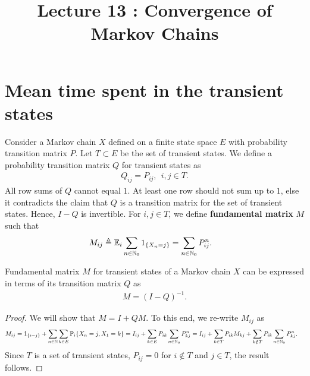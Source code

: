 \documentclass[a4paper,10pt,english]{article}
\title{Lecture 13 : Convergence of Markov Chains} %
\author{}
\begin{document}
\maketitle

\section{Mean time spent in the transient states}
Consider a Markov chain $X$ defined on a finite state space $E$ with probability transition matrix $P$. 
Let $T \subset E$ be the set of transient states. 
We define a probability transition matrix $Q$ for transient states as 
\begin{align*}
Q_{ij} = P_{ij},~~i,j \in T.
\end{align*}
All row sums of $Q$ cannot equal $1$. 
At least one row should not sum up to $1$, else it contradicts the claim that $Q$ is a transition matrix for the set of transient states. 
Hence, $I-Q$ is invertible. 
For $i,j \in T$, we define \textbf{fundamental matrix} $M$ such that
\begin{align*}
M_{ij} &\triangleq \mathbb{E}_i\sum_{n\in \mathbb{N}_0} 1_{\{X_n = j\}} = \sum_{n \in \mathbb{N}_0}P^n_{ij}.
\end{align*}
\begin{lem} 
Fundamental matrix $M$ for transient states of a Markov chain $X$ can be expressed in terms of its transition matrix $Q$ as
\begin{align*}
M = (I - Q)^{-1}.
\end{align*}
\end{lem}
\begin{proof}
We will show that $M = I + QM$. 
To this end, we re-write $M_{ij}$ as 
\begin{align*}
M_{ij} &= 1_{\{i = j\}} + \sum_{n \in \mathbb{N}}\sum_{k \in E}\mathbb{P}_i\{X_n = j, X_1 = k\} = I_{ij} + \sum_{k \in E}P_{ik}\sum_{n \in \mathbb{N}_0}P^n_{kj} = I_{ij} + \sum_{k \in T} P_{ik}M_{kj} + \sum_{k \notin T} P_{ik}\sum_{n \in \mathbb{N}_0}P^n_{kj}.
\end{align*}
Since $T$ is a set of transient states, $P_{ij} = 0$ for $i \notin T$ and $j \in T$, the result follows.  
\end{proof}
\end{document}
